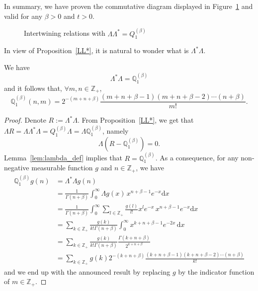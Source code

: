 \documentclass[10pt]{amsart}
\theoremstyle{definition}\newtheorem{defi}[theo]{Definition}\newtheorem{rema}[theo]{Remark}\newtheorem{exam}[theo]{Example}\newtheorem{exem}[theo]{Example}\newtheorem{nota}[theo]{Notation}
\newcommand{\df}{\mathrel{:=}}
\newcommand{\ZZ}{\mathbb{Z}}
\newcommand{\fm}{\mathfrak{m}}
\newcommand{\iy}{\infty}
\newcommand{\dBs}{{\discret{Q}}}
\newcommand{\Bs}{Q}
\newcommand{\esL}{\mathbf{L}}
\newcommand{\esLd}{\ell}
\newcommand{\discret}[1]{\mathds{#1}}
\newcommand{\adjL}{\Lambda^*}
\let\oldforall\forall
\renewcommand*{\forall}{\mathrel{\oldforall}}
\newcommand*{\dd}{\mathrm{d}}
\newcommand*{\dx}{\dd x}
\begin{document}
In summary, we have proven the commutative diagram displayed in Figure~\ref{fig1} and valid for any $\beta>0$ and $t>0$.

\begin{figure}[ht]\centering
{}
\caption{Intertwining relations with $\Lambda\adjL =\Bs^{(\beta)}_1$}\label{fig1}
\end{figure}

In view of Proposition~\ref{LL*}, it is natural to wonder what is $\adjL \Lambda$.

\begin{prop}\label{L*L}
We have
\[
\adjL \Lambda=\dBs^{(\beta)}_1
\]
and it follows that, $\forall m,n\in\ZZ_+$,
\[
\dBs^{(\beta)}_1(n,m)=2^{-(m+n+\beta)} \frac{(m+n+\beta-1)(m+n+\beta-2)\cdots (n+\beta)}{m!}.
\]
\end{prop}
\begin{proof}
Denote $R\df \adjL \Lambda$. From Proposition~\ref{LL*}, we get that $\Lambda R=\Lambda \adjL \Lambda =\Bs_1^{(\beta)}\Lambda=\Lambda \dBs_1^{(\beta)}$, namely
\[
\Lambda (R-\dBs^{(\beta)}_1)=0.
\]
Lemma~\ref{lem:lambda_def} implies that $R=\dBs^{(\beta)}_1$. As a consequence, for any non-negative measurable function $g$ and $n\in\ZZ_+$, we have
\begin{align*}
\dBs^{(\beta)}_1 g(n)&=
\adjL \Lambda g(n)\\&=
\frac1{\Gamma(n+\beta)}\int_0^{\iy} \Lambda g (x)\, x^{n+\beta-1}e^{-x}\dx\\
&=\frac1{\Gamma(n+\beta)}\int_0^{\iy} \sum_{l\in\ZZ_+}\frac{g(l)}{l!}x^l e^{-x}\, x^{n+\beta-1}e^{-x}\dx\\
&=\sum_{k\in\ZZ_+}\frac{g(k)}{k!\Gamma(n+\beta)}\int_0^{\iy} x^{k+n+\beta-1}e^{-2x}\,\dx\\
&=\sum_{k\in\ZZ_+}\frac{g(k)}{k!\Gamma(n+\beta)}\frac{\Gamma(k+n+\beta)}{2^{k+n+\beta}}\\
&=\sum_{k\in\ZZ_+} g(k)2^{-(k+n+\beta)} \frac{(k+n+\beta-1)(k+n+\beta-2)\cdots (n+\beta)}{k!}
\end{align*}
and we end up with the announced result by replacing $g$ by the indicator function of $m\in\ZZ_+$.
\end{proof}
\end{document}
